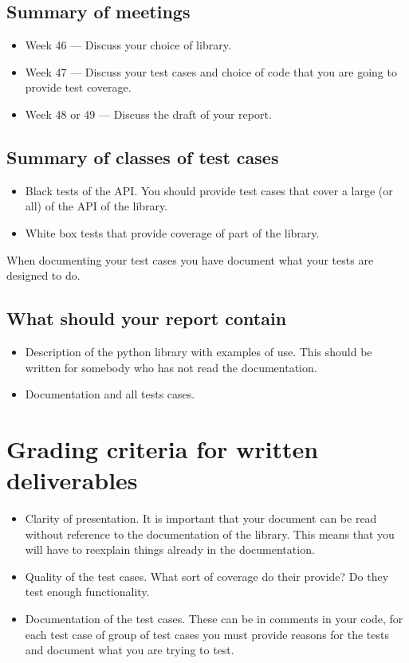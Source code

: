 \documentclass[a4page]{article}
\begin{document}
  \subsection*{Summary of meetings}
  \begin{itemize}
  \item Week 46  --- Discuss your choice of library.
  \item Week 47  --- Discuss your test cases and choice of code that you are
    going to provide test coverage.
  \item Week 48 or 49 --- Discuss the draft of your report.
  \end{itemize}
  \subsection*{Summary of classes of test cases}
  \begin{itemize}
  \item Black tests of the API. You should provide test cases that cover a
    large  (or all) of the API of the library.
  \item White box tests that provide coverage of part of the library.
  \end{itemize}
  When documenting your test cases you have document what your tests are
  designed to do.

  \subsection*{What should your report contain}
  \begin{itemize}
  \item Description of the python library with examples of use. This should be
    written for somebody who has not read the documentation.
  \item Documentation and all tests cases.
  \end{itemize}
\section{Grading criteria for written deliverables}
\begin{itemize}
\item Clarity of presentation. It is important that your document can
  be read without reference to the documentation of the library. This
  means that you will have to reexplain things already in the
  documentation. 
\item Quality of the test cases. What sort of coverage do their
  provide? Do they test enough functionality. 
\item Documentation of the test cases. These can be in comments in
  your code, for each test case of group of test cases you must
  provide reasons for the tests and document  what you are trying to
  test.
 
\end{itemize}
\end{document}
